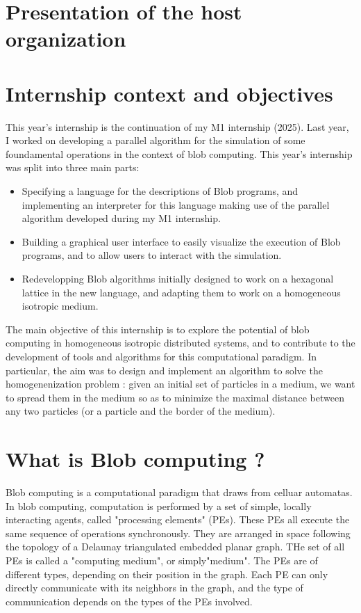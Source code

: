 \documentclass[11pt,a4paper]{report}
\begin{document}
\section{Presentation of the host organization} 
\label{sec:context}
\lipsum[1]

\section{Internship context and objectives}
\label{sec:motivation}

This year's internship is the continuation of my M1 internship (2025). Last year, I worked on developing a parallel algorithm for the simulation of some foundamental operations in the context of blob computing. This year's internship was split into three main parts:
\begin{itemize}
    \item Specifying a language for the descriptions of Blob programs, and implementing an interpreter for this language making use of the parallel algorithm developed during my M1 internship.
    \item Building a graphical user interface to easily visualize the execution of Blob programs, and to allow users to interact with the simulation.
    \item Redevelopping Blob algorithms initially designed to work on a hexagonal lattice in the new language, and adapting them to work on a homogeneous isotropic medium.
\end{itemize}

The main objective of this internship is to explore the potential of blob computing in homogeneous isotropic distributed systems, and to contribute to the development of tools and algorithms for this computational paradigm. In particular, the aim was to design and implement an algorithm to solve the homogenenization problem : given an initial set of particles in a medium, we want to spread them in the medium so as to minimize the maximal distance between any two particles (or a particle and the border of the medium).

\section{What is Blob computing ?}
\label{sec:name}

Blob computing is a computational paradigm that draws from celluar automatas. In blob computing, computation is performed by a set of simple, locally interacting agents, called "processing elements" (PEs). These PEs all execute the same sequence of operations synchronously. They are arranged in space following the topology of a Delaunay triangulated embedded planar graph. THe set of all PEs is called a "computing medium", or simply"medium". The PEs are of different types, depending on their position in the graph. Each PE can only directly communicate with its neighbors in the graph, and the type of communication depends on the types of the PEs involved.
\end{document}
